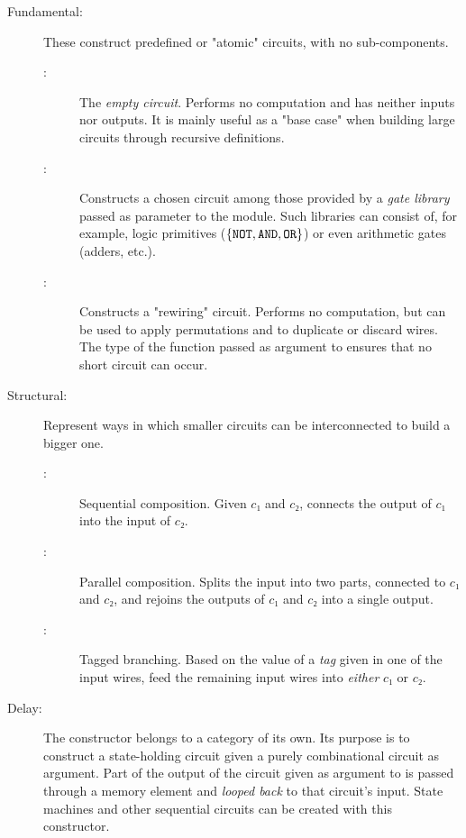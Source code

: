         \begin{description}
            \item[Fundamental:] These construct predefined or "atomic" circuits, with no sub-components.
                \begin{description}
                    \item[:] The \emph{empty circuit}. Performs no computation and has neither inputs nor outputs.
                        It is mainly useful as a "base case" when building large circuits through recursive definitions.
                    \item[:] Constructs a chosen circuit among those provided by a \emph{gate library}
                        passed as parameter to the  module. Such libraries can consist of, for example,
                        logic primitives ($\{ \text{\texttt{NOT}}, \text{\texttt{AND}}, \text{\texttt{OR}} \}$)
                        or even arithmetic gates (adders, etc.).
                    \item[:] Constructs a "rewiring" circuit. Performs no computation,
                        but can be used to apply permutations and to duplicate or discard wires.
                        The type of the function passed as argument to  ensures that no short circuit can occur.
                \end{description}
            \item[Structural:] Represent ways in which smaller circuits can be interconnected to build a bigger one.
                \begin{description}
                    \item[:] Sequential composition.
                        Given $c₁$ and $c₂$, connects the output of $c₁$ into the input of $c₂$.
                    \item[:] Parallel composition.
                        Splits the input into two parts, connected to $c₁$ and $c₂$,
                        and rejoins the outputs of $c₁$ and $c₂$ into a single output.
                    \item[:] Tagged branching.
                        Based on the value of a \emph{tag} given in one of the input wires,
                        feed the remaining input wires into \emph{either} $c₁$ or $c₂$.
                \end{description}
            \item[Delay:]
                The  constructor belongs to a category of its own.
                Its purpose is to construct a state-holding circuit given a purely combinational circuit as argument.
                Part of the output of the circuit given as argument to 
                is passed through a memory element and \emph{looped back} to that circuit's input.
                State machines and other sequential circuits can be created with this constructor.
        \end{description}

